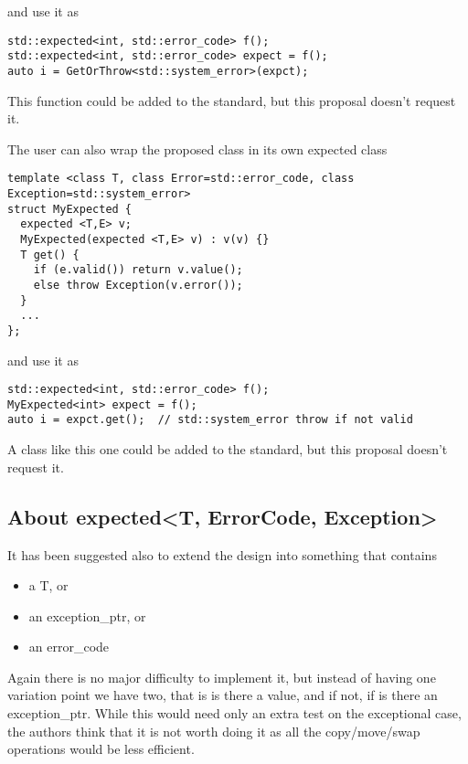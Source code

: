 \documentclass[a4paper,10pt]{article}
\begin{document}
and use it as

\begin{lstlisting}
std::expected<int, std::error_code> f();
std::expected<int, std::error_code> expect = f();
auto i = GetOrThrow<std::system_error>(expct);  
\end{lstlisting}

This function could be added to the standard, but this proposal doesn't request it. 

The user can also wrap the proposed class in its own expected class

\begin{lstlisting}
template <class T, class Error=std::error_code, class Exception=std::system_error>
struct MyExpected {
  expected <T,E> v;
  MyExpected(expected <T,E> v) : v(v) {}
  T get() {  
    if (e.valid()) return v.value();
    else throw Exception(v.error());
  }
  ...
};
\end{lstlisting}

and use it as

\begin{lstlisting}
std::expected<int, std::error_code> f();
MyExpected<int> expect = f();
auto i = expct.get();  // std::system_error throw if not valid
\end{lstlisting}

A class like this one could be added to the standard, but this proposal doesn't request it. 

\subsection{About expected<T, ErrorCode, Exception>}

It has been suggested also to extend the design into something that contains 

\begin{itemize}
\item a T, or
\item an exception_ptr, or 
\item an error_code
\end{itemize}

Again there is no major difficulty to implement it, but instead of having one variation point we have two, that is is there a value, and if not, if is there an exception_ptr. While this would need only an extra test on the exceptional case, the authors think that it is not worth doing it as all the copy/move/swap operations would be less efficient.  
\end{document}

